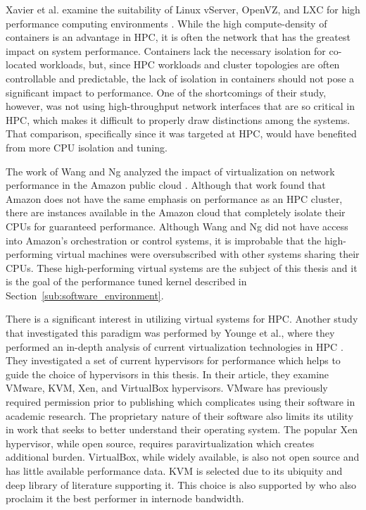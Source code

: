 Xavier et al. examine the suitability of Linux vServer, OpenVZ, and LXC for high performance computing environments \autocite{xavier2013performance}.
While the high compute-density of containers is an advantage in HPC, it is often the network that has the greatest impact on system performance.
Containers lack the necessary isolation for co-located workloads, but, since HPC workloads and cluster topologies are often controllable and predictable, the lack of isolation in containers should not pose a significant impact to performance.
One of the shortcomings of their study, however, was not using high-throughput network interfaces that are so critical in HPC, which makes it difficult to properly draw distinctions among the systems.
That comparison, specifically since it was targeted at HPC, would have benefited from more CPU isolation and tuning.  

The work of Wang and Ng analyzed the impact of virtualization on network performance in the Amazon public cloud \autocite{wangAmazon2010}.
Although that work found that Amazon does not have the same emphasis on performance as an HPC cluster, there are instances available in the Amazon cloud that completely isolate their CPUs for guaranteed performance.  
Although Wang and Ng did not have access into Amazon's orchestration or control systems, it is improbable that the high-performing virtual machines were oversubscribed with other systems sharing their CPUs. 
These high-performing virtual systems are the subject of this thesis and it is the goal of the performance tuned kernel described in Section~\ref{sub:software_environment}.  

There is a significant interest in utilizing virtual systems for HPC.  Another study that investigated this paradigm was performed by Younge et al., where they performed an in-depth analysis of current virtualization technologies in HPC \autocite{_younge_1}.
They investigated a set of current hypervisors for performance which helps to guide the choice of hypervisors in this thesis. 
In their article, they examine VMware, KVM, Xen, and VirtualBox hypervisors. 
VMware has previously required permission prior to publishing which complicates using their software in academic research.  
The proprietary nature of their software also limits its utility in work that seeks to better understand their operating system.  
The popular Xen hypervisor, while open source, requires paravirtualization which creates additional burden.
VirtualBox, while widely available, is also not open source and has little available performance data.  
KVM is selected due to its ubiquity and deep library of literature supporting it.
This choice is also supported by \autocite{_younge_1} who also proclaim it the best performer in internode bandwidth.  

